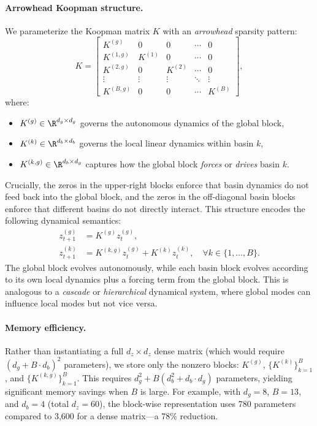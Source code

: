 \paragraph{Arrowhead Koopman structure.}
We parameterize the Koopman matrix $K$ with an \emph{arrowhead} sparsity pattern:
\begin{equation}
\label{eq:arrowhead-K}
    K = \begin{bmatrix}
        K^{(g)} & 0 & 0 & \cdots & 0 \\
        K^{(1,g)} & K^{(1)} & 0 & \cdots & 0 \\
        K^{(2,g)} & 0 & K^{(2)} & \cdots & 0 \\
        \vdots & \vdots & \vdots & \ddots & \vdots \\
        K^{(B,g)} & 0 & 0 & \cdots & K^{(B)}
    \end{bmatrix},
\end{equation}
where:
\begin{itemize}
    \item $K^{(g)} \in \R^{d_g \times d_g}$ governs the autonomous dynamics of the global block,
    \item $K^{(k)} \in \R^{d_b \times d_b}$ governs the local linear dynamics within basin $k$,
    \item $K^{(k,g)} \in \R^{d_b \times d_g}$ captures how the global block \emph{forces} or \emph{drives} basin $k$.
\end{itemize}
Crucially, the zeros in the upper-right blocks enforce that basin dynamics do not feed back into the global block, and the zeros in the off-diagonal basin blocks enforce that different basins do not directly interact. This structure encodes the following dynamical semantics:
\begin{align}
    z^{(g)}_{t+1} &= K^{(g)} z^{(g)}_t, \\
    z^{(k)}_{t+1} &= K^{(k,g)} z^{(g)}_t + K^{(k)} z^{(k)}_t, \quad \forall k \in \{1, \ldots, B\}.
\end{align}
The global block evolves autonomously, while each basin block evolves according to its own local dynamics plus a forcing term from the global block. This is analogous to a \emph{cascade} or \emph{hierarchical} dynamical system, where global modes can influence local modes but not vice versa.

\paragraph{Memory efficiency.}
Rather than instantiating a full $d_z \times d_z$ dense matrix (which would require $(d_g + B \cdot d_b)^2$ parameters), we store only the nonzero blocks: $K^{(g)}$, $\{K^{(k)}\}_{k=1}^B$, and $\{K^{(k,g)}\}_{k=1}^B$. This requires $d_g^2 + B(d_b^2 + d_b \cdot d_g)$ parameters, yielding significant memory savings when $B$ is large. For example, with $d_g = 8$, $B = 13$, and $d_b = 4$ (total $d_z = 60$), the block-wise representation uses 780 parameters compared to 3,600 for a dense matrix---a 78\% reduction.

